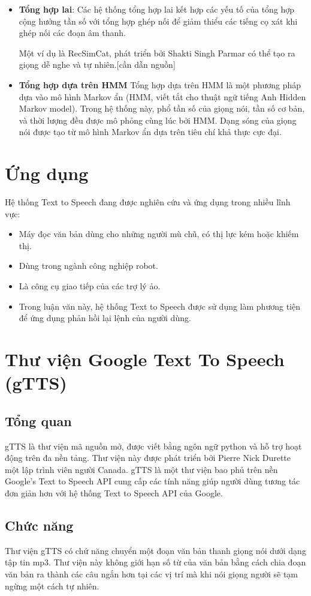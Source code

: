 \begin{itemize}
\item \textbf{Tổng hợp lai}: Các hệ thống tổng hợp lai kết hợp các yếu tố của tổng hợp cộng hưởng tần số với tổng hợp ghép nối để giảm thiểu các tiếng cọ xát khi ghép nối các đoạn âm thanh.

Một ví dụ là RecSimCat, phát triển bởi Shakti Singh Parmar có thể tạo ra giọng dễ nghe và tự nhiên.[cần dẫn nguồn]

\item \textbf{Tổng hợp dựa trên HMM}
Tổng hợp dựa trên HMM là một phương pháp dựa vào mô hình Markov ẩn (HMM, viết tắt cho thuật ngữ tiếng Anh Hidden Markov model). Trong hệ thống này, phổ tần số của giọng nói, tần số cơ bản, và thời lượng đều được mô phỏng cùng lúc bởi HMM. Dạng sóng của giọng nói được tạo từ mô hình Markov ẩn dựa trên tiêu chí khả thực cực đại.
\end{itemize}

\section{Ứng dụng}
Hệ thống Text to Speech đang được nghiên cứu và ứng dụng trong nhiều lĩnh vực:
\begin{itemize}
	\item Máy đọc văn bản dùng cho những người mù chũ, có thị lực kém hoặc khiếm thị.
	\item Dùng trong ngành công nghiệp robot.
	\item Là công cụ giao tiếp của các trợ lý ảo.
	\item Trong luận văn này, hệ thống Text to Speech được sử dụng làm phương tiện để ứng dụng phản hồi lại lệnh của người dùng.
\end{itemize}

\section{Thư viện Google Text To Speech (gTTS)}
\subsection{Tổng quan}
gTTS là thư viện mã nguồn mở, được viết bằng ngôn ngữ python và hỗ trợ hoạt động trên đa nền tảng. Thư viện này được phát triển bởi Pierre Nick Durette một lập trình viên người Canada.
gTTS là một thư viện bao phủ trên nền Google's Text to Speech API cung cấp các tính năng giúp người dùng tương tác đơn giản hơn với hệ thống Text to Speech API của Google.

\subsection{Chức năng}
Thư viện gTTS có chứ năng chuyển một đoạn văn bản thanh giọng nói dưới dạng tập tin mp3. Thư viện này không giới hạn số từ của văn bản bằng cách chia đoạn văn bản ra thành các câu ngắn hơn tại các vị trí mà khi nói giọng người sẽ tạm ngừng một cách tự nhiên.

